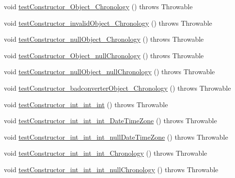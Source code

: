 \begin{DoxyCompactItemize}
void \hyperlink{classorg_1_1joda_1_1time_1_1_test_date_midnight___constructors_a4b20b95917490f00006f128758d9f7f2}{test\-Constructor\-\_\-\-Object\-\_\-\-Chronology} ()  throws Throwable 
\item 
void \hyperlink{classorg_1_1joda_1_1time_1_1_test_date_midnight___constructors_a2e79911288a6181e7168f9d08bf4ddf3}{test\-Constructor\-\_\-invalid\-Object\-\_\-\-Chronology} ()  throws Throwable 
\item 
void \hyperlink{classorg_1_1joda_1_1time_1_1_test_date_midnight___constructors_ad6c868fbfa43f9bb7ccbbb9d41022288}{test\-Constructor\-\_\-null\-Object\-\_\-\-Chronology} ()  throws Throwable 
\item 
void \hyperlink{classorg_1_1joda_1_1time_1_1_test_date_midnight___constructors_a0ccb93c013a9ab5ea6fe3fd04c94b1f3}{test\-Constructor\-\_\-\-Object\-\_\-null\-Chronology} ()  throws Throwable 
\item 
void \hyperlink{classorg_1_1joda_1_1time_1_1_test_date_midnight___constructors_a7e580e9286c2390ec08e47050ac4c4ec}{test\-Constructor\-\_\-null\-Object\-\_\-null\-Chronology} ()  throws Throwable 
\item 
void \hyperlink{classorg_1_1joda_1_1time_1_1_test_date_midnight___constructors_a8c0c4be6dd09ca6c6cd6972991d2d6e2}{test\-Constructor\-\_\-badconverter\-Object\-\_\-\-Chronology} ()  throws Throwable 
\item 
void \hyperlink{classorg_1_1joda_1_1time_1_1_test_date_midnight___constructors_a62f395a3d5c972c0c7f95ed47b855777}{test\-Constructor\-\_\-int\-\_\-int\-\_\-int} ()  throws Throwable 
\item 
void \hyperlink{classorg_1_1joda_1_1time_1_1_test_date_midnight___constructors_a7e333c3adeddd48117f7b37d5ddac9d7}{test\-Constructor\-\_\-int\-\_\-int\-\_\-int\-\_\-\-Date\-Time\-Zone} ()  throws Throwable 
\item 
void \hyperlink{classorg_1_1joda_1_1time_1_1_test_date_midnight___constructors_a392eae2cb63f52da49fa4044fbf39ca7}{test\-Constructor\-\_\-int\-\_\-int\-\_\-int\-\_\-null\-Date\-Time\-Zone} ()  throws Throwable 
\item 
void \hyperlink{classorg_1_1joda_1_1time_1_1_test_date_midnight___constructors_a5df2ae6aeeff28b51c9bcdccd57772f4}{test\-Constructor\-\_\-int\-\_\-int\-\_\-int\-\_\-\-Chronology} ()  throws Throwable 
\item 
void \hyperlink{classorg_1_1joda_1_1time_1_1_test_date_midnight___constructors_ac61ebb0f07bc870fc12b6aae41eb26fc}{test\-Constructor\-\_\-int\-\_\-int\-\_\-int\-\_\-null\-Chronology} ()  throws Throwable 
\end{DoxyCompactItemize}
